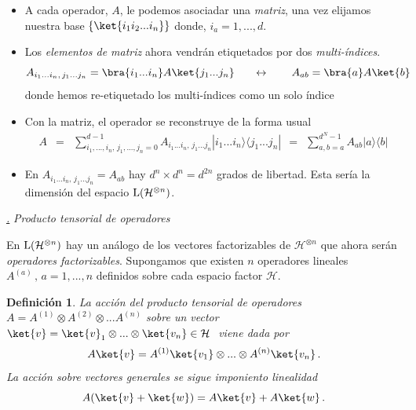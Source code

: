 \documentclass[a4paper,11pt]{book} %
\newtheorem{definicion_contador}{Definición}
\newcommand{\Definicion}[1]{
		\begin{mybox_gray2}{}
			\begin{definicion_contador}
				 #1 
			\end{definicion_contador} 
		\end{mybox_gray2}
	}
\numberwithin{equation}{chapter}
\newcommand{\ketbra}[2]{| #1\rangle \! \langle #2|}
\def\subsubiContadorIt{\par\addtocounter{subsubsection}{1}\underline{\it\thesubsubsection.}\hskip0.5cm \setcounter{subsubsubsectionIt}{0}}
\newcommand{\SubsubiIt}[1]{
		\subsubiContadorIt \textit{#1}
	}
\newcounter{subsubsubsectionIt}[subsubsection]
\begin{document}
\begin{itemize}
	\item A cada operador, $A$, le podemos asociadar una \textit{matriz}, una vez elijamos nuestra base  $\{ \ket{i_1 i_2... i_n}\}$ donde, $i_a = 1,...,d$.
	
	\item Los \textit{elementos de matriz} ahora vendrán etiquetados por dos \textit{multi-índices}. 
	\begin{equation}
	 A_{i_1...i_n, \, j_1...j_n} = \bra{i_1...i_n}A\ket{j_1...j_n}  ~~~~~\leftrightarrow ~~~~~~ A_{ab}= \bra{a}A\ket{b}
	\end{equation}
donde hemos re-etiquetado los multi-índices como un solo índice
	
	\item Con la matriz, el operador se reconstruye de la forma usual
\begin{eqnarray} 
 A &=& 
 \sum_{i_1,...,i_n,\, j_1,...,j_n=0}^{d-1} A_{i_1...i_n, \, j_1...j_n} \ketbra{i_1...i_n}{j_1...j_n}
 ~~=~~
  \sum_{a,b=a}^{d^{N}-1} A_{ab} \ketbra{a}{b}
\end{eqnarray}
	
	\item En $A_{i_1...i_n,\,j_1...j_n} = A_{ab}$ hay $d^n\times d^n = d^{2n}$ grados de libertad. Esta sería la dimensión del espacio  ${\rm L}(\mathcal{H}^{\otimes n})$.
		
\end{itemize}





			\SubsubiIt{Producto tensorial de operadores}

En ${\rm L}(\mathcal{H}^{\otimes n})$ hay un análogo de los vectores factorizables de $\mathcal{H}^{\otimes n}$ que ahora serán \textit{operadores factorizables}. Supongamos que existen $n$ operadores lineales $A^{(a)}\, ,\, a=1,...,n$ definidos sobre cada espacio factor $\mathcal{H}$. 

	\Definicion{
	La acción del producto tensorial de operadores  $A = A^{(1)}\otimes A^{(2)} \otimes ...A^{(n)}$ sobre un vector $\ket{v} = \ket{v}_1\otimes ...\otimes \ket{v_n}\in \mathcal{H}~$   viene dada por 
	\begin{equation}
	A\ket{v} = A^{(1)}\ket{v_1}\otimes ... \otimes A^{(n)} \ket{v_n}\, .	
	\end{equation}	
	La acción sobre vectores generales se sigue imponiento linealidad
	\begin{equation}
	A(\ket{v} + \ket{w}) = A\ket{v} + A\ket{w}\, .
	\end{equation}
	}
\end{document}
